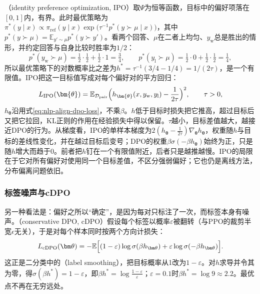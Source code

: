 （identity preference optimization, IPO）取$\Psi$为恒等函数，目标中的偏好项落在$[0,1]$内，有界。此时最优策略为$\pi^*(y\mid x)\propto\pi_{\mathrm{ref}}(y\mid x)\exp\bigl(\tau^{-1}p^*(y\succ\mu\mid x)\bigr)$，其中$p^*(y\succ\mu)=\mathbb E_{y'\sim\mu}p^*(y\succ y')$。看两个回答、$\mu$在二者上均匀、$y_{\mathrm w}$总是胜出的情形，并约定回答与自身比较时胜率为$1/2$：
\[
 p^*(y_{\mathrm w}\succ\mu)=\tfrac12\cdot\tfrac12+\tfrac12\cdot1=\tfrac34,\qquad
 p^*(y_{\mathrm l}\succ\mu)=\tfrac12\cdot0+\tfrac12\cdot\tfrac12=\tfrac14,
\]
所以最优策略下的对数概率比之差为$h^*=\tau^{-1}(3/4-1/4)=1/(2\tau)$，是一个有限值。IPO把这一目标值写成对每个偏好对的平方回归：
\begin{equation}
\label{eq:nlp-align-ipo}
 L_{\mathrm{IPO}}(\bm{\theta})
 =\mathbb{E}_{\mathcal{D}_{\mathrm{pair}}}
    \Bigl(h_{\bm{\theta}}(x,y_{\mathrm w},y_{\mathrm l})-\frac{1}{2\tau}\Bigr)^2,
 \qquad \tau>0,
\end{equation}
$h_{\bm\theta}$沿用式\eqref{eq:nlp-align-dpo-loss}，不乘$\beta$。$h$低于目标时损失把它推高，超过目标后又把它拉回，KL正则的作用在经验损失中得以保留。$\tau$越小，目标差值越大，越接近DPO的行为。从梯度看，IPO的单样本梯度为$2(h_{\bm\theta}-\frac{1}{2\tau})\nabla_{\bm\theta}h_{\bm\theta}$，权重随$h$与目标的差线性变化，并在越过目标后变号；DPO的权重$\beta\sigma(-\beta h_{\bm\theta})$始终为正，只是随$h$增大而趋于0。前者把$h$钉在一个有限值附近，后者只是越推越慢。IPO的局限在于它对所有偏好对使用同一个目标差值，不区分强弱偏好；它也仍是离线方法，分布偏离问题依旧。

\subsubsection{标签噪声与cDPO}
\label{sec:nlp-align-cdpo}

另一种看法是：偏好之所以“确定”，是因为每对只标注了一次，而标签本身有噪声。（conservative DPO, cDPO）假设每个标签以概率$\varepsilon$被翻转（与PPO的裁剪半宽$\epsilon$无关），于是对每个样本同时按两个方向计损失\cite{nlp-align-mitchell2023cdpo}：
\begin{equation}
\label{eq:nlp-align-cdpo}
 L_{\mathrm{cDPO}}(\bm\theta)=-\mathbb E\Bigl[(1-\varepsilon)\log\sigma(\beta h_{\bm\theta})+\varepsilon\log\sigma(-\beta h_{\bm\theta})\Bigr].
\end{equation}
这正是二分类中的（label smoothing），把目标概率从1改为$1-\varepsilon$。对$h$求导并令其为零，得$\sigma(\beta h^*)=1-\varepsilon$，即$\beta h^*=\log\frac{1-\varepsilon}{\varepsilon}$；$\varepsilon=0.1$时$\beta h^*=\log9\approx2.2$。最优点不再在无穷远处。

